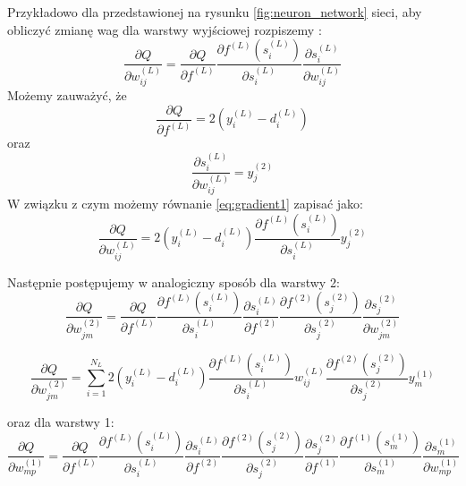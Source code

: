 \documentclass[a4paper,12pt]{article}
\numberwithin{equation}{section}
\begin{document}
Przykładowo dla przedstawionej na rysunku \ref{fig:neuron_network} sieci, aby obliczyć zmianę wag dla warstwy wyjściowej rozpiszemy \cite{zajdel_9}:
\begin{equation}
    \label{eq:gradient1}
    \frac{\partial Q}{\partial w^{(L)}_{ij}} = \frac{\partial Q}{\partial f^{(L)}} \frac{\partial f^{(L)}(s_i^{(L)})}{\partial s^{(L)}_i} \frac{\partial s^{(L)}_i}{\partial w^{(L)}_{ij}} 
\end{equation}
Możemy zauważyć, że
\begin{equation}
    \frac{\partial Q}{\partial f^{(L)}} = 2(y_i^{(L)} - d^{(L)}_i)
\end{equation}
oraz
\begin{equation}
    \frac{\partial s^{(L)}_i}{\partial w^{(L)}_{ij}} = y^{(2)}_j
\end{equation}
W związku z czym możemy równanie \ref{eq:gradient1} zapisać jako:
\begin{equation}
    \frac{\partial Q}{\partial w^{(L)}_{ij}} = 2(y_i^{(L)} - d^{(L)}_i) \frac{\partial f^{(L)}(s_i^{(L)})}{\partial s^{(L)}_i} y^{(2)}_j
\end{equation}

\noindent Następnie postępujemy w analogiczny sposób dla warstwy 2:
\begin{equation}
    \frac{\partial Q}{\partial w_{jm}^{(2)}} = \frac{\partial Q}{\partial f^{(L)}} \frac{\partial f^{(L)}(s_i^{(L)})}{\partial s^{(L)}_i} \frac{\partial s^{(L)}_i}{\partial f^{(2)}} \frac{\partial f^{(2)}(s_j^{(2)})}{\partial s^{(2)}_j} \frac{\partial s_j^{(2)}}{\partial  w_{jm}^{(2)}}
\end{equation}

\begin{equation}
    \frac{\partial Q}{\partial w^{(2)}_{jm}} = \sum_{i=1}^{N_L} 2(y_i^{(L)} - d^{(L)}_i) \frac{\partial f^{(L)}(s_i^{(L)})}{\partial s^{(L)}_i} w^{(L)}_{ij} \frac{\partial f^{(2)}(s_j^{(2)})}{\partial s^{(2)}_j} y^{(1)}_m
\end{equation}

\noindent oraz dla warstwy 1:
\begin{equation}
    \frac{\partial Q}{\partial w_{mp}^{(1)}} = \frac{\partial Q}{\partial f^{(L)}} \frac{\partial f^{(L)}(s_i^{(L)})}{\partial s^{(L)}_i} \frac{\partial s^{(L)}_i}{\partial f^{(2)}} \frac{\partial f^{(2)}(s_j^{(2)})}{\partial s^{(2)}_j} \frac{\partial s_j^{(2)}}{\partial  f^{(1)}} \frac{\partial f^{(1)}(s_m^{(1)})}{\partial s_m^{(1)}} \frac{\partial s_m^{(1)}}{\partial w_{mp}^{(1)}}
\end{equation}
\end{document}
